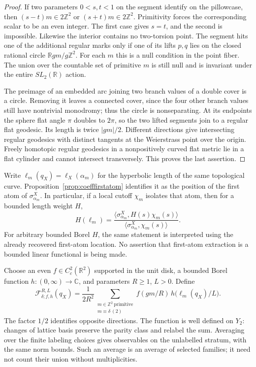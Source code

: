 \documentclass[11pt,a4paper]{article}
\numberwithin{equation}{section}
\theoremstyle{definition}
\theoremstyle{remark}
\newcommand{\RR}{\mathbb R}
\newcommand{\CC}{\mathbb C}
\newcommand{\ZZ}{\mathbb Z}
\begin{document}
\begin{proof}
If two parameters $0<s,t<1$ on the segment identify on the pillowcase,
then $(s-t)m\in2\ZZ^2$ or $(s+t)m\in2\ZZ^2$. Primitivity forces
the corresponding scalar to be an even integer. The first case gives
$s=t$, and the second is impossible. Likewise the interior contains no
two-torsion point. The segment hits one of the additional regular marks
only if one of its lifts $p,q$ lies on the closed rational circle
$\RR gm/g\ZZ^2$. For each $m$ this is a null condition in the point
fiber. The union over the countable set of primitive $m$ is still null
and is invariant under the entire $SL_2(\RR)$ action.

The preimage of an embedded arc joining two branch values of a double
cover is a circle. Removing it leaves a connected cover, since the four
other branch values still have nontrivial monodromy; thus the circle is
nonseparating. At its endpoints the sphere flat angle $\pi$ doubles to
$2\pi$, so the two lifted segments join to a regular flat geodesic.
Its length is twice $|gm|/2$. Different directions give intersecting
regular geodesics with distinct tangents at the Weierstrass point over
the origin. Freely homotopic regular geodesics in a nonpositively curved
flat metric lie in a flat cylinder and cannot intersect transversely.
This proves the last assertion.
\end{proof}

Write $\ell_m(q_X)=\ell_X(\alpha_m)$ for the hyperbolic length of the
same topological curve. Proposition~\ref{prop:coefffirstatom} identifies
it as the position of the first atom of $\sigma^X_{\alpha_m}$. In
particular, if a local cutoff $\chi_m$ isolates that atom, then for a
bounded length weight $H$,
\begin{equation}
 H(\ell_m)=
 \frac{\langle\sigma^X_{\alpha_m},H(s)\chi_m(s)\rangle}
      {\langle\sigma^X_{\alpha_m},\chi_m(s)\rangle}.
 \label{eq:polearccoefficientweight}
\end{equation}
For arbitrary bounded Borel $H$, the same statement is interpreted
using the already recovered first-atom location. No assertion that
first-atom extraction is a bounded linear functional is being made.

Choose an even $f\in C_c^2(\RR^2)$ supported in the unit disk, a bounded
Borel function $h:(0,\infty)\to\CC$, and parameters $R\geq1$, $L>0$.
Define
\begin{equation}
 \mathcal F_{\delta;f,h}^{R,L}(q_X)
  =\frac1{2R^2}
    \sum_{\substack{m\in\ZZ^2\ \mathrm{primitive}\\m\equiv\delta\ (2)}}
       f(gm/R)\,h\bigl(\ell_m(q_X)/L\bigr).
 \label{eq:polearcobservable}
\end{equation}
The factor $1/2$ identifies opposite directions. The function is
well defined on $Y_2$: changes of lattice basis preserve the parity
class and relabel the sum. Averaging over the finite labeling choices
gives observables on the unlabelled stratum, with the same norm bounds.
Such an average is an average of selected families; it need not count
their union without multiplicities.
\end{document}
